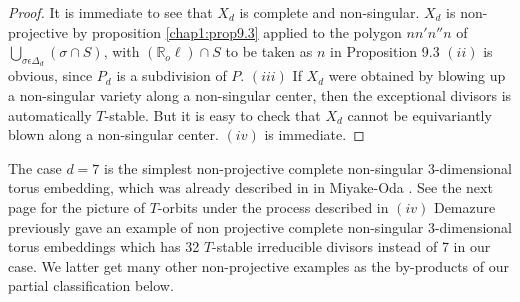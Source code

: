 \begin{proof}
It is immediate to see that $X_d$ is complete and non-singular. $X_d$
is non-projective by proposition \ref{chap1:prop9.3} applied to the polygon
$nn'n''n$ of $\underset{\sigma\epsilon\Delta_d}{\bigcup}(\sigma\cap
S)$, with $(\mathbb{R}_o\ell)\cap S$  to be taken as $n$ in Proposition 9.3
$(ii)$ is obvious, since $P_d$ is a subdivision of $P$. $(iii)$ If
$X_d$ were obtained by blowing up a non-singular variety along a
non-singular center, then the exceptional divisors is automatically
$T$-stable. But it is easy to check that $X_d$ cannot be equivariantly
blown along a non-singular center. $(iv)$ is immediate.  
\end{proof}

\begin{remark*}
The case $d=7$ is the simplest non-projective complete non-singular
3-dimensional torus embedding, which was already described in in
Miyake-Oda \cite{keyMO}. See the next  page for the picture of $T$-orbits
under the process described in $(iv)$ Demazure \cite[Appendice]{keyD2}
previously gave an example of non projective complete non-singular
3-dimensional torus embeddings which has 32 $T$-stable irreducible
divisors instead of 7 in our case. We latter get many other
non-projective examples as the by-products of our partial
classification below.
\newpage


\end{remark*}
